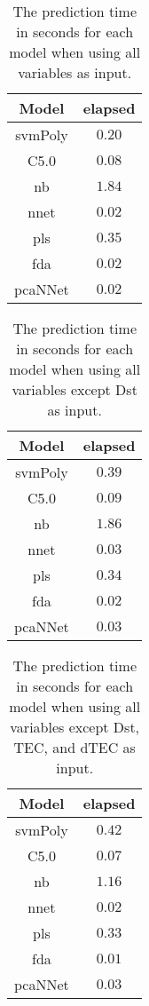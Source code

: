 \begin{table}[!ht]
	\centering
	\begin{tabular}{|c|c|}
		\hline
		Model & elapsed \\ \hline
		svmPoly & $0.20$ \\ \hline
		C5.0 & $0.08$ \\ \hline
		nb & $1.84$ \\ \hline
		nnet & $0.02$ \\ \hline
		pls & $0.35$ \\ \hline
		fda & $0.02$ \\ \hline
		pcaNNet & $0.02$ \\ \hline
	\end{tabular}
	\caption{The prediction time in seconds for each model when using all variables as input.}
	\label{tab:time:all:predict}
\end{table}

\begin{table}[!ht]
	\centering
	\begin{tabular}{|c|c|}
		\hline
		Model & elapsed \\ \hline
		svmPoly & $0.39$ \\ \hline
		C5.0 & $0.09$ \\ \hline
		nb & $1.86$ \\ \hline
		nnet & $0.03$ \\ \hline
		pls & $0.34$ \\ \hline
		fda & $0.02$ \\ \hline
		pcaNNet & $0.03$ \\ \hline
	\end{tabular}
	\caption{The prediction time in seconds for each model when using all variables except Dst as input.}
	\label{tab:time:noDst:predict}
\end{table}

\begin{table}[!ht]
	\centering
	\begin{tabular}{|c|c|}
		\hline
		Model & elapsed \\ \hline
		svmPoly & $0.42$ \\ \hline
		C5.0 & $0.07$ \\ \hline
		nb & $1.16$ \\ \hline
		nnet & $0.02$ \\ \hline
		pls & $0.33$ \\ \hline
		fda & $0.01$ \\ \hline
		pcaNNet & $0.03$ \\ \hline
	\end{tabular}
	\caption{The prediction time in seconds for each model when using all variables except Dst, TEC, and dTEC as input.}
	\label{tab:time:noTEC:predict}
\end{table}

